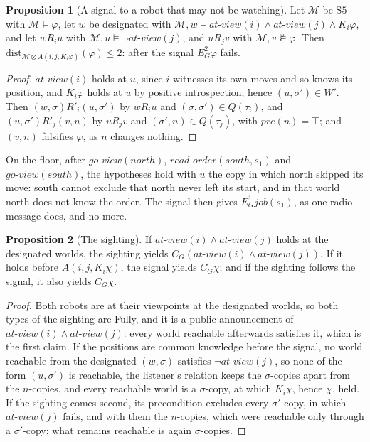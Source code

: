 \documentclass[11pt,a4paper]{article}
\theoremstyle{definition}
\newtheorem{proposition}{Proposition}
\newcommand{\Mod}{\mathcal{M}}
\newcommand{\prd}{\otimes}
\newcommand{\Kop}[1]{K_{#1}}
\newcommand{\Eop}[1]{E_{#1}}
\newcommand{\Cop}[1]{C_{#1}}
\newcommand{\ag}[1]{\mathit{#1}}
\newcommand{\job}{\mathit{job}}
\newcommand{\pre}{\mathit{pre}}
\newcommand{\dist}{\mathrm{dist}}
\newcommand{\atview}{\mathit{at\text{-}view}}
\begin{document}
\begin{proposition}[A signal to a robot that may not be watching]
\label{prop:unseen}
Let $\Mod$ be $\mathrm{S5}$ with $\Mod \models \varphi$, let $w$ be designated
with $\Mod, w \models \atview(i) \wedge \atview(j) \wedge \Kop{i}\varphi$, and
let $w R_i u$ with $\Mod, u \models \neg\atview(j)$, and $u R_j v$ with
$\Mod, v \not\models \varphi$. Then
$\dist_{\Mod \prd A(i,j,\Kop{i}\varphi)}(\varphi) \leq 2$: after the signal
$\Eop{G}^2\varphi$ fails.
\end{proposition}

\begin{proof}
$\atview(i)$ holds at $u$, since $i$ witnesses its own moves and so knows its
position, and $\Kop{i}\varphi$ holds at $u$ by positive introspection; hence
$(u,\sigma') \in W'$. Then $(w,\sigma) \mathrel{R'_i} (u,\sigma')$ by $w R_i u$ and
$(\sigma,\sigma') \in Q(\tau_i)$, and $(u,\sigma') \mathrel{R'_j} (v,n)$ by
$u R_j v$ and $(\sigma',n) \in Q(\tau_j)$, with $\pre(n) = \top$; and
$(v,n)$ falsifies $\varphi$, as $n$ changes nothing.
\end{proof}

\noindent
On the floor, after $\mathit{go\text{-}view}(\ag{north})$,
$\mathit{read\text{-}order}(\ag{south}, s_1)$ and $\mathit{go\text{-}view}(\ag{south})$,
the hypotheses hold with $u$ the copy in which north skipped its move: south
cannot exclude that north never left its start, and in that world north does
not know the order. The signal then gives $\Eop{G}^1\job(s_1)$, as one radio
message does, and no more.

\begin{proposition}[The sighting]
\label{prop:sighting}
If $\atview(i) \wedge \atview(j)$ holds at the designated worlds, the sighting
yields $\Cop{G}(\atview(i) \wedge \atview(j))$. If it holds before
$A(i,j,\Kop{i}\chi)$, the signal yields $\Cop{G}\chi$; and if the sighting
follows the signal, it also yields $\Cop{G}\chi$.
\end{proposition}

\begin{proof}
Both robots are at their viewpoints at the designated worlds, so both types of
the sighting are Fully, and it is a public announcement of
$\atview(i) \wedge \atview(j)$: every world reachable afterwards satisfies it,
which is the first claim. If the positions are common knowledge before the
signal, no world reachable from the designated $(w,\sigma)$ satisfies
$\neg\atview(j)$, so none of the form $(u,\sigma')$ is reachable, the listener's
relation keeps the $\sigma$-copies apart from the $n$-copies, and every
reachable world is a $\sigma$-copy, at which $\Kop{i}\chi$, hence $\chi$, held.
If the sighting comes second, its precondition excludes every
$\sigma'$-copy, in which $\atview(j)$ fails, and with them the $n$-copies, which
were reachable only through a $\sigma'$-copy; what remains reachable is again
$\sigma$-copies.
\end{proof}
\end{document}
